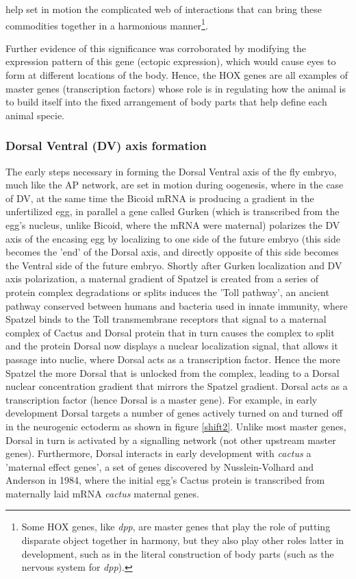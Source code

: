 help set in motion the complicated web of interactions that can bring these commodities together in a harmonious manner\footnote{Some HOX genes, like \textit{dpp}, are master genes that play the role of putting disparate object together in harmony, but they also play other roles latter in development, such as in the literal construction of body parts (such as the nervous system for \textit{dpp}).}. 

Further evidence of this significance was corroborated by modifying the expression pattern of this gene (ectopic expression), which would cause eyes to form at different locations of the body\cite{pmid10461206}.  Hence, the HOX genes are all examples of master genes (transcription factors) whose role is in regulating how the animal is to build itself into the fixed arrangement of body parts that help define each animal specie. 

\subsubsection{Dorsal Ventral (DV) axis formation}
The early steps necessary in forming the Dorsal Ventral axis of the fly embryo, much like the AP network, are set in motion during oogenesis, where in the case of DV, at the same time the Bicoid mRNA is producing a gradient in the unfertilized egg, in parallel a gene called Gurken (which is transcribed from the egg's nucleus, unlike Bicoid, where the mRNA were maternal) polarizes the DV axis of the encasing egg by localizing to one side of the future embryo (this side becomes the 'end' of the Dorsal axis, and directly opposite of this side becomes the Ventral side of the future embryo.  Shortly after Gurken localization and DV axis polarization, a maternal gradient of Spatzel is created from a series of protein complex degradations or splits induces the 'Toll pathway', an ancient pathway conserved between humans and bacteria used in innate immunity, where Spatzel binds to the Toll transmembrane receptors that signal to a maternal complex of Cactus and Dorsal protein that in turn causes the complex to split and the protein Dorsal now displays a nuclear localization signal, that allows it passage into nuclie, where Dorsal acts as a transcription factor.  Hence the more Spatzel the more Dorsal that is unlocked from the complex, leading to a Dorsal nuclear concentration gradient that mirrors the Spatzel gradient. Dorsal acts as a transcription factor (hence Dorsal is a master gene).  For example, in early development Dorsal targets a number of genes actively turned on and turned off in the neurogenic ectoderm as shown in figure \ref{shift2}.  Unlike most master genes, Dorsal in turn is activated by a signalling network (not other upstream master genes).  Furthermore, Dorsal interacts in early development with \textit{cactus} a 'maternal effect genes', a set of genes discovered by Nusslein-Volhard and Anderson in 1984, where the initial egg's Cactus protein is transcribed from maternally laid mRNA \textit{cactus} maternal genes.

